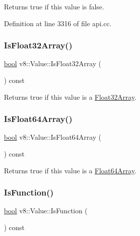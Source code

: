 Returns true if this value is false. 

Definition at line 3316 of file api.\+cc.

\mbox{\label{classv8_1_1Value_aafedbffb06cdd267149f241ad7926d9d}} 
\subsubsection{\texorpdfstring{Is\+Float32\+Array()}{IsFloat32Array()}}
{\footnotesize\ttfamily \mbox{\hyperlink{classbool}{bool}} v8\+::\+Value\+::\+Is\+Float32\+Array (\begin{DoxyParamCaption}{ }\end{DoxyParamCaption}) const}

Returns true if this value is a \mbox{\hyperlink{classv8_1_1Float32Array}{Float32\+Array}}. \mbox{\label{classv8_1_1Value_a7ed4de7b1d4467cdd69eb128b3ecfdf2}} 
\subsubsection{\texorpdfstring{Is\+Float64\+Array()}{IsFloat64Array()}}
{\footnotesize\ttfamily \mbox{\hyperlink{classbool}{bool}} v8\+::\+Value\+::\+Is\+Float64\+Array (\begin{DoxyParamCaption}{ }\end{DoxyParamCaption}) const}

Returns true if this value is a \mbox{\hyperlink{classv8_1_1Float64Array}{Float64\+Array}}. \mbox{\label{classv8_1_1Value_ac7a649d482c41cfc6281a4215a091a6d}} 
\subsubsection{\texorpdfstring{Is\+Function()}{IsFunction()}}
{\footnotesize\ttfamily \mbox{\hyperlink{classbool}{bool}} v8\+::\+Value\+::\+Is\+Function (\begin{DoxyParamCaption}{ }\end{DoxyParamCaption}) const}

